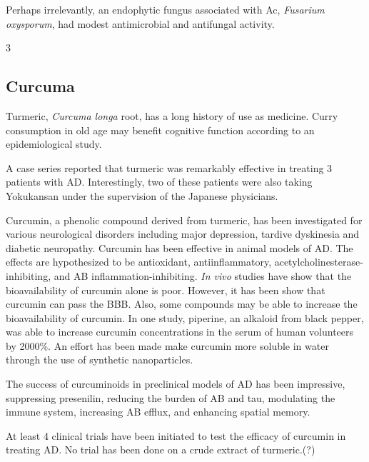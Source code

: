 \documentclass[twocolumn]{article}
\begin{document}
Perhaps irrelevantly, an endophytic fungus associated with Ac,
\textit{Fusarium oxysporum},
had modest antimicrobial and antifungal
activity.
\cite{barik2010phylogenetic}

3




\subsection{Curcuma}

Turmeric, \textit{Curcuma longa} root, has a long history of use as medicine.
\cite{?}
Curry consumption in old age may benefit cognitive function
according to an epidemiological study.
\cite{ng2006curry}

A case series reported that turmeric was remarkably effective
in treating 3 patients with AD.
Interestingly, two of these patients were also taking
Yokukansan under the supervision of the Japanese physicians.
\cite{hishikawa2012effects}





Curcumin, a phenolic compound derived from turmeric,
has been investigated for various neurological disorders including
major depression, tardive dyskinesia and diabetic neuropathy.
\cite{kulkarni2010overview}
Curcumin has been effective in animal models of AD.
\cite{?}
The effects are hypothesized to be antioxidant, antiinflammatory,
acetylcholinesterase-inhibiting,
and AB inflammation-inhibiting.
\cite{?}
\textit{In vivo} studies have show that
the bioavailability of curcumin alone is poor.
\cite{?}
However, it has been show that curcumin can pass the BBB.
Also, some compounds may be able to increase the bioavailability
of curcumin. In one study, piperine, an alkaloid from black pepper,
was able to increase curcumin concentrations in the
serum of human volunteers by 2000\%.
\cite{shoba1998log}
An effort has been made make curcumin more soluble in water
through the use of synthetic nanoparticles.
\cite{mathew2012curcumin}

The success of curcuminoids in preclinical models of AD has been impressive,
suppressing presenilin,
reducing the burden of AB and tau,
modulating the immune system,
increasing AB efflux,
and enhancing spatial memory.
\cite{
yoshida2011turmeric,
shytle2012optimized,
ahmed2010curcuminoids,
ahmed2011comparative,
zhang2006curcuminoids,
villaflores2012effects
}

At least 4 clinical trials have been initiated
to test the efficacy of curcumin in treating AD.
No trial has been done on a crude extract of turmeric.(?)
\end{document}
